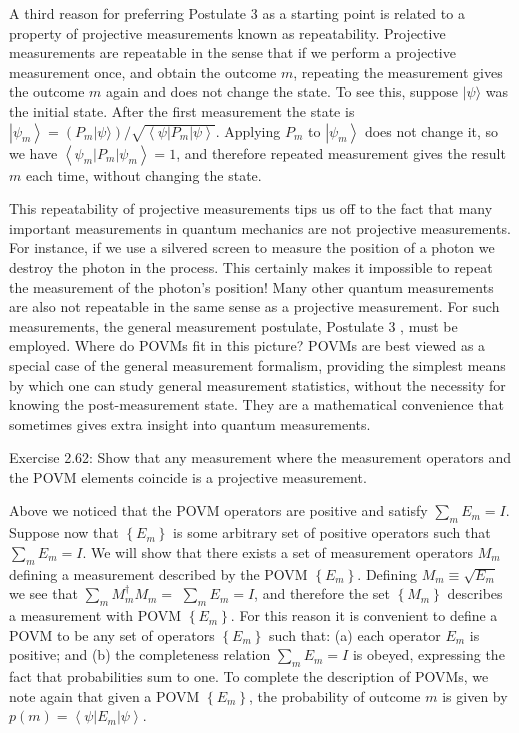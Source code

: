 \documentclass[10pt]{article}
\begin{document}
A third reason for preferring Postulate 3 as a starting point is related to a property of projective measurements known as repeatability. Projective measurements are repeatable in the sense that if we perform a projective measurement once, and obtain the outcome $m$, repeating the measurement gives the outcome $m$ again and does not change the state. To see this, suppose $|\psi\rangle$ was the initial state. After the first measurement the state is $\left|\psi_{m}\right\rangle=\left(P_{m}|\psi\rangle\right) / \sqrt{\left\langle\psi\left|P_{m}\right| \psi\right\rangle}$. Applying $P_{m}$ to $\left|\psi_{m}\right\rangle$ does not change it, so we have $\left\langle\psi_{m}\left|P_{m}\right| \psi_{m}\right\rangle=1$, and therefore repeated measurement gives the result $m$ each time, without changing the state.

This repeatability of projective measurements tips us off to the fact that many important measurements in quantum mechanics are not projective measurements. For instance, if we use a silvered screen to measure the position of a photon we destroy the photon in the process. This certainly makes it impossible to repeat the measurement of the photon's position! Many other quantum measurements are also not repeatable in the same sense as a projective measurement. For such measurements, the general measurement postulate, Postulate 3 , must be employed. Where do POVMs fit in this picture? POVMs are best viewed as a special case of the general measurement formalism, providing the simplest means by which one can study general measurement statistics, without the necessity for knowing the post-measurement state. They are a mathematical convenience that sometimes gives extra insight into quantum measurements.

Exercise 2.62: Show that any measurement where the measurement operators and the POVM elements coincide is a projective measurement.

Above we noticed that the POVM operators are positive and satisfy $\sum_{m} E_{m}=I$. Suppose now that $\left\{E_{m}\right\}$ is some arbitrary set of positive operators such that $\sum_{m} E_{m}=I$. We will show that there exists a set of measurement operators $M_{m}$ defining a measurement described by the POVM $\left\{E_{m}\right\}$. Defining $M_{m} \equiv \sqrt{E_{m}}$ we see that $\sum_{m} M_{m}^{\dagger} M_{m}=$ $\sum_{m} E_{m}=I$, and therefore the set $\left\{M_{m}\right\}$ describes a measurement with POVM $\left\{E_{m}\right\}$. For this reason it is convenient to define a POVM to be any set of operators $\left\{E_{m}\right\}$ such that: (a) each operator $E_{m}$ is positive; and (b) the completeness relation $\sum_{m} E_{m}=I$ is obeyed, expressing the fact that probabilities sum to one. To complete the description of POVMs, we note again that given a POVM $\left\{E_{m}\right\}$, the probability of outcome $m$ is given by $p(m)=\left\langle\psi\left|E_{m}\right| \psi\right\rangle$.
\end{document}
